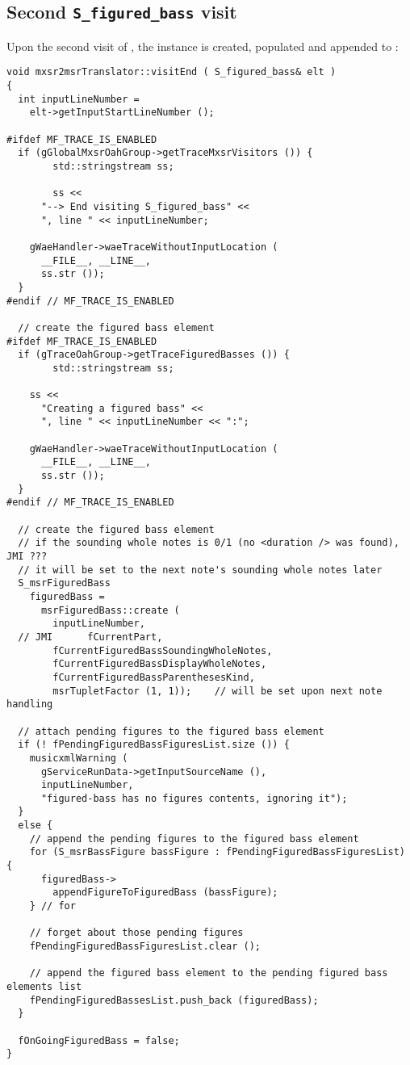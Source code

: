 \subsection{Second {\tt S_figured_bass} visit}

Upon the second visit of , the  instance is created, populated and appended to :
\begin{lstlisting}[language=CPlusPlus]
void mxsr2msrTranslator::visitEnd ( S_figured_bass& elt )
{
  int inputLineNumber =
    elt->getInputStartLineNumber ();

#ifdef MF_TRACE_IS_ENABLED
  if (gGlobalMxsrOahGroup->getTraceMxsrVisitors ()) {
		std::stringstream ss;

		ss <<
      "--> End visiting S_figured_bass" <<
      ", line " << inputLineNumber;

    gWaeHandler->waeTraceWithoutInputLocation (
      __FILE__, __LINE__,
      ss.str ());
  }
#endif // MF_TRACE_IS_ENABLED

  // create the figured bass element
#ifdef MF_TRACE_IS_ENABLED
  if (gTraceOahGroup->getTraceFiguredBasses ()) {
		std::stringstream ss;

    ss <<
      "Creating a figured bass" <<
      ", line " << inputLineNumber << ":";

    gWaeHandler->waeTraceWithoutInputLocation (
      __FILE__, __LINE__,
      ss.str ());
  }
#endif // MF_TRACE_IS_ENABLED

  // create the figured bass element
  // if the sounding whole notes is 0/1 (no <duration /> was found), JMI ???
  // it will be set to the next note's sounding whole notes later
  S_msrFiguredBass
    figuredBass =
      msrFiguredBass::create (
        inputLineNumber,
  // JMI      fCurrentPart,
        fCurrentFiguredBassSoundingWholeNotes,
        fCurrentFiguredBassDisplayWholeNotes,
        fCurrentFiguredBassParenthesesKind,
        msrTupletFactor (1, 1));    // will be set upon next note handling

  // attach pending figures to the figured bass element
  if (! fPendingFiguredBassFiguresList.size ()) {
    musicxmlWarning (
      gServiceRunData->getInputSourceName (),
      inputLineNumber,
      "figured-bass has no figures contents, ignoring it");
  }
  else {
    // append the pending figures to the figured bass element
    for (S_msrBassFigure bassFigure : fPendingFiguredBassFiguresList) {
      figuredBass->
        appendFigureToFiguredBass (bassFigure);
    } // for

    // forget about those pending figures
    fPendingFiguredBassFiguresList.clear ();

    // append the figured bass element to the pending figured bass elements list
    fPendingFiguredBassesList.push_back (figuredBass);
  }

  fOnGoingFiguredBass = false;
}
\end{lstlisting}


